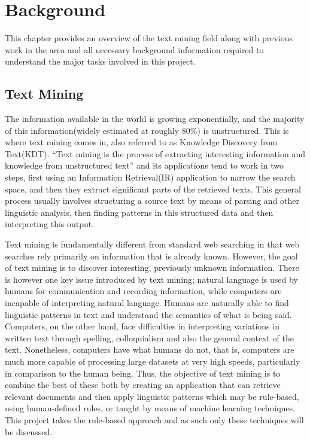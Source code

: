 \chapter{Background}
\label{cha:background}
This chapter provides an overview of the text mining field along with previous work in the area and all necessary background information required to understand the major tasks involved in this project.

\section{Text Mining}
\label{sec:textmining}
The information available in the world is growing exponentially, and the majority of this information(widely estimated at roughly 80\%) is unstructured. This is where text mining comes in, also referred to as Knowledge Discovery from Text(KDT).
``Text mining is the process of extracting interesting information and knowledge from unstructured text''\cite{hotho-etal-ldv-2005} and its applications tend to work in two steps, first using an Information Retrieval(IR) application to narrow the search space, and then they extract significant parts of the retrieved texts\cite{Polajnar2006}. This general process usually involves structuring a source text by means of parsing and other linguistic analysis, then finding patterns in this structured data and then interpreting this output.

Text mining is fundamentally different from standard web searching in that web searches rely primarily on information that is already known. However, the goal of text mining is to discover interesting, previously unknown information\cite{Gupta_Lehal_2009}.
There is however one key issue introduced by text mining; natural language is used by humans for communication and recording information, while computers are incapable of interpreting natural language. Humans are naturally able to find linguistic patterns in text and understand the semantics of what is being said. Computers, on the other hand, face difficulties in interpreting variations in written text through spelling, colloquialism and also the general context of the text. Nonetheless, computers have what humans do not, that is, computers are much more capable of processing large datasets at very high speeds, particularly in comparison to the human being. Thus, the objective of text mining is to combine the best of these both by creating an application that can retrieve relevant documents and then apply linguistic patterns which may be rule-based, using human-defined rules, or taught by means of machine learning techniques. This project takes the rule-based approach and as such only these techniques will be discussed.

